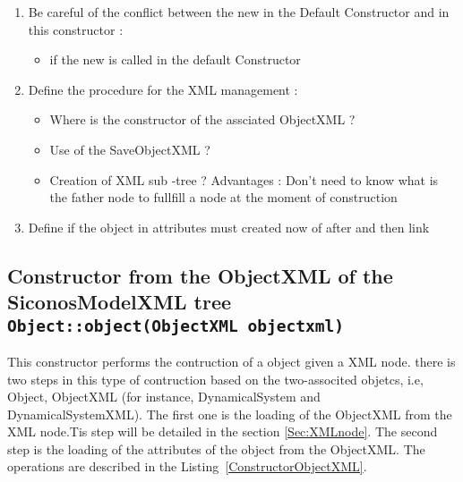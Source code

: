 



 \begin{ndr}
   \begin{enumerate}
   \item Be careful of the conflict between the new in the Default Constructor and in this constructor :
     \begin{itemize}
     \item if the new is called in the default Constructor
     \end{itemize}
   \item Define the procedure for the XML management :
     \begin{itemize}
     \item  Where  is the constructor of the assciated ObjectXML ? 
     \item  Use of the SaveObjectXML ?
     \item  Creation of XML sub -tree ? Advantages : Don't need to know what is the father node to fullfill a node at the moment of construction
     \end{itemize}
   \item Define if the object in attributes must created now of after and then link
   \end{enumerate}
 \end{ndr}


\subsection{Constructor from the ObjectXML of the SiconosModelXML tree {\small \tt Object::object(ObjectXML objectxml) }}

This constructor performs  the contruction of a object given a XML node. there is two steps in this type of contruction  based on the two-associted objetcs, i.e, Object, ObjectXML (for instance, DynamicalSystem and DynamicalSystemXML). The first one is the loading of the ObjectXML from the XML node.Tis step will be detailed in the section \ref{Sec:XMLnode}. The second  step is the loading of the attributes of the object from the ObjectXML. The operations are described in the Listing~\ref{ConstructorObjectXML}.

